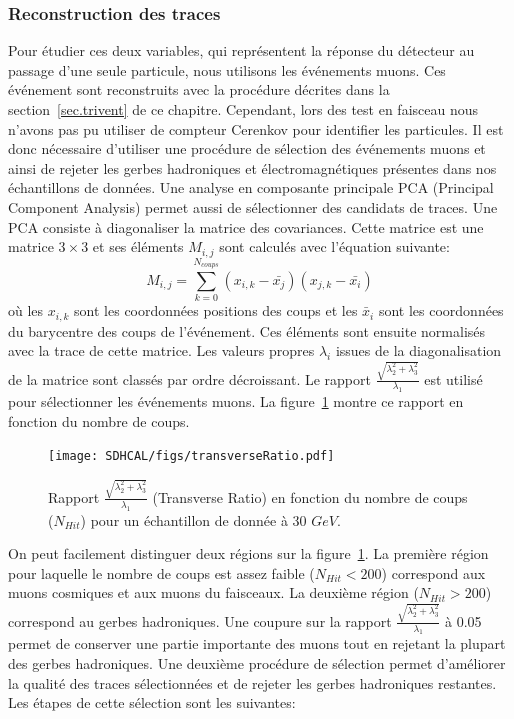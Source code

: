 \subsubsection{Reconstruction des traces}
Pour étudier ces deux variables, qui représentent la réponse du détecteur au passage d'une seule particule, nous utilisons les événements muons. Ces événement sont reconstruits avec la procédure décrites dans la section~\ref{sec.trivent} de ce chapitre. Cependant, lors des test en faisceau nous n'avons pas pu utiliser de compteur Cerenkov pour identifier les particules. Il est donc nécessaire d'utiliser une procédure de sélection des événements muons et ainsi de rejeter les gerbes hadroniques et électromagnétiques présentes dans nos échantillons de données. Une analyse en composante principale PCA (Principal Component Analysis) permet aussi de sélectionner des candidats de traces. Une PCA consiste à diagonaliser la matrice des covariances. Cette matrice est une matrice $3\times3$ et ses éléments $M_{i,j}$ sont calculés avec l'équation suivante:
\begin{equation}
  M_{i,j}=\sum_{k=0}^{N_{coups}}{(x_{i,k}-\bar{x_j})(x_{j,k}-\bar{x_i})}
\end{equation}
où les $x_{i,k}$ sont les coordonnées positions des coups et les $\bar x_i$ sont les coordonnées du barycentre des coups de l'événement. Ces éléments sont ensuite normalisés avec la trace de cette matrice. Les valeurs propres $\lambda_i$ issues de la diagonalisation de la matrice sont classés par ordre décroissant. Le rapport $\frac{\sqrt{\lambda_2^2+\lambda_3^2}}{\lambda_1}$ est utilisé pour sélectionner les événements muons. La figure~\ref{fig:transverseRatio} montre ce rapport en fonction du nombre de coups. 
\begin{figure}[!h]
  \begin{center}
    \texttt{[image: SDHCAL/figs/transverseRatio.pdf]}
    \caption{Rapport $\frac{\sqrt{\lambda_2^2+\lambda_3^2}}{\lambda_1}$ (Transverse Ratio) en fonction du nombre de coups ($N_{Hit}$) pour un échantillon de donnée à 30 $GeV$.}
    \label{fig:transverseRatio}
  \end{center}
\end{figure}
On peut facilement distinguer deux régions sur la figure~\ref{fig:transverseRatio}. La première région pour laquelle le nombre de coups est assez faible ($N_{Hit}<200$) correspond aux muons cosmiques et aux muons du faisceaux. La deuxième région ($N_{Hit}>200$) correspond au gerbes hadroniques. Une coupure sur la rapport $\frac{\sqrt{\lambda_2^2+\lambda_3^2}}{\lambda_1}$ à 0.05 permet de conserver une partie importante des muons tout en rejetant la plupart des gerbes hadroniques. Une deuxième procédure de sélection permet d'améliorer la qualité des traces sélectionnées et de rejeter les gerbes hadroniques restantes. Les étapes de cette sélection sont les suivantes:
